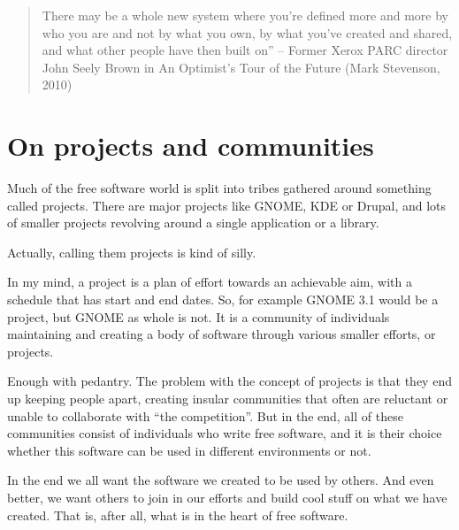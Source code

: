 

\begin{quote}
There may be a whole new system where you're defined more and more by who you
are and not by what you own, by what you've created and shared, and what other
people have then built on” -- Former Xerox PARC director John Seely Brown in An
Optimist's Tour of the Future (Mark Stevenson, 2010)
\end{quote}

\section*{On projects and communities}

Much of the free software world is split into tribes gathered around something
called projects. There are major projects like GNOME, KDE or Drupal, and lots of
smaller projects revolving around a single application or a library.

Actually, calling them projects is kind of silly.

In my mind, a project is a plan of effort towards an achievable aim, with a
schedule that has start and end dates. So, for example GNOME 3.1 would be a
project, but GNOME as whole is not. It is a community of individuals maintaining
and creating a body of software through various smaller efforts, or projects.

Enough with pedantry. The problem with the concept of projects is that they end
up keeping people apart, creating insular communities that often are reluctant
or unable to collaborate with ``the competition''. But in the end, all of these
communities consist of individuals who write free software, and it is their
choice whether this software can be used in different environments or not.

In the end we all want the software we created to be used by others. And even
better, we want others to join in our efforts and build cool stuff on what we
have created. That is, after all, what is in the heart of free software.

